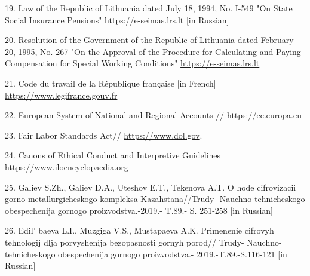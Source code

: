 \begin{references}
19. Law of the Republic of Lithuania dated July 18, 1994, No. I-549
"On State Social Insurance Pensions"
\href{https://e-seimas.lrs.lt/portal/legalAct/lt/TAD/TAIS.420452?jfwid=mmceok8cw}{https://e-seimas.lrs.lt}
{[}in Russian{]}

20. Resolution of the Government of the Republic of Lithuania dated
February 20, 1995, No. 267
"On the Approval of the Procedure for Calculating and Paying
Compensation for Special Working Conditions"
\href{https://e-seimas.lrs.lt/portal/legalAct/lt/TAD/TAIS.59421?jfwid=3d5v1wt4t}{https://e-seimas.lrs.lt}

21. Code du travail de la République française {[}in French{]}
\href{https://www.legifrance.gouv.fr/codes/texte_lc/LEGITEXT000006072050}{https://www.legifrance.gouv.fr}

22. European System of National and Regional Accounts //
\href{https://ec.europa.eu/eurostat/statistics-explained/index.php?title=European_system_of_national_and_regional_accounts_-_ESA_2010}{https://ec.europa.eu}

23. Fair Labor Standards Act//
\href{https://www.dol.gov/agencies/whd/flsa\#:~:text=The\%20Fair\%20Labor\%20Standards\%20Act\%20(FLSA)\%20establishes\%20minimum\%20wage\%2C,\%2C\%20State\%2C\%20and\%20local\%20governments}{https://www.dol.gov}.

24. Canons of Ethical Conduct and Interpretive Guidelines
\href{https://www.iloencyclopaedia.org/part-iii-48230/ethical-issues/item/1228-canons-of-ethical-conduct}{https://www.iloencyclopaedia.org}

25. Galiev S.Zh., Galiev D.A., Uteshov E.T., Tekenova A.T. O hode
cifrovizacii gorno-metallurgicheskogo kompleksa Kazahstana//Trudy-
Nauchno-tehnicheskogo obespechenija
gornogo proizvodstva.-2019.- T.89.- S. 251-258 {[}in Russian{]}

26. Edil' baeva L.I., Muzgiga V.S., Mustapaeva A.K.
Primenenie cifrovyh tehnologij dlja porvyshenija bezopasnosti gornyh
porod// Trudy- Nauchno-tehnicheskogo obespechenija gornogo
proizvodstva.- 2019.-T.89.-S.116-121 {[}in Russian{]}
\end{references}


